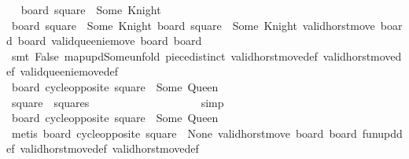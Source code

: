 \begin{isabellebody}
\ \isamarkupfalse%
\ {\isachardoublequoteopen}board\ square{\isacharprime}\ {\isacharequal}\ Some\ Knight{\isachardoublequoteclose}\isanewline
\ \ \ \ \ \ \ \ \ \ \ \ \ \ \ \ \isamarkupfalse%
\ {\isacartoucheopen}board{\isacharprime}{\isacharprime}\ square\ {\isacharequal}\ Some\ Knight{\isacartoucheclose}\ {\isacartoucheopen}board{\isacharprime}\ square{\isacharprime}\ {\isacharequal}\ Some\ Knight{\isacartoucheclose}\ {\isacartoucheopen}valid{\isacharunderscore}horst{\isacharunderscore}move\ board\ board{\isacharprime}{\isacartoucheclose}\ {\isacartoucheopen}valid{\isacharunderscore}queenie{\isacharunderscore}move\ board{\isacharprime}\ board{\isacharprime}{\isacharprime}{\isacartoucheclose}\ \isanewline
\ \ \ \ \ \ \ \ \ \ \ \ \ \ \ \ \isamarkupfalse%
\ {\isacharparenleft}smt\ False\ map{\isacharunderscore}upd{\isacharunderscore}Some{\isacharunderscore}unfold\ piece{\isachardot}distinct{\isacharparenleft}{}{\isacharparenright}\ valid{\isacharunderscore}horst{\isacharunderscore}move{\isacharprime}{\isacharunderscore}def\ valid{\isacharunderscore}horst{\isacharunderscore}move{\isacharunderscore}def\ valid{\isacharunderscore}queenie{\isacharunderscore}move{\isacharunderscore}def{\isacharparenright}\isanewline
\ \ \ \ \ \ \ \ \ \ \ \ \ \ \isamarkupfalse%
\ \isamarkupfalse%
\ {\isachardoublequoteopen}board\ {\isacharparenleft}cycle{\isacharunderscore}opposite\ square{\isacharprime}{\isacharparenright}\ {\isacharequal}\ Some\ Queen{\isachardoublequoteclose}\isanewline
\ \ \ \ \ \ \ \ \ \ \ \ \ \ \ \ \isamarkupfalse%
\ {\isacartoucheopen}square{\isacharprime}\ {\isasymin}\ squares{\isacartoucheclose}\ {}\ \isanewline
\ \ \ \ \ \ \ \ \ \ \ \ \ \ \ \ \isamarkupfalse%
\ simp\isanewline
\ \ \ \ \ \ \ \ \ \ \ \ \ \ \isamarkupfalse%
\ \isamarkupfalse%
\ {\isachardoublequoteopen}board{\isacharprime}\ {\isacharparenleft}cycle{\isacharunderscore}opposite\ square{\isacharprime}{\isacharparenright}\ {\isacharequal}\ Some\ Queen{\isachardoublequoteclose}\isanewline
\ \ \ \ \ \ \ \ \ \ \ \ \ \ \ \ \isamarkupfalse%
\ {\isacharparenleft}metis\ {\isacartoucheopen}board{\isacharprime}\ {\isacharparenleft}cycle{\isacharunderscore}opposite\ square{\isacharprime}{\isacharparenright}\ {\isacharequal}\ None{\isacartoucheclose}\ {\isacartoucheopen}valid{\isacharunderscore}horst{\isacharunderscore}move\ board\ board{\isacharprime}{\isacartoucheclose}\ fun{\isacharunderscore}upd{\isacharunderscore}def\ valid{\isacharunderscore}horst{\isacharunderscore}move{\isacharprime}{\isacharunderscore}def\ valid{\isacharunderscore}horst{\isacharunderscore}move{\isacharunderscore}def{\isacharparenright}\isanewline

\end{isabellebody}
